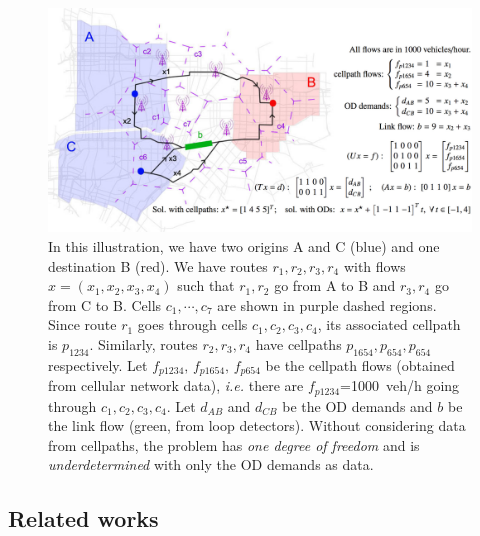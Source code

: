 \begin{figure}[h!]
  \centering
    \includegraphics[width=0.47	\textwidth]{figures/setup}
  \caption{\footnotesize{In this illustration, we have two origins A and C ({\color{blue}blue}) and one destination B ({\color{red}red}). We have routes $r_1,r_2,r_3,r_4$ with flows $x=(x_1,x_2,x_3, x_4)$ such that $r_1,r_2$ go from A to B and $r_3,r_4$ go from C to B. Cells $c_1,\cdots,c_7$ are shown in {\color{magenta} purple} dashed regions. Since route $r_1$ goes through cells $c_1,c_2,c_3,c_4$, its associated cellpath is $p_{1234}$. Similarly, routes $r_2,r_3,r_4$ have cellpaths $p_{1654},p_{654},p_{654}$ respectively. Let $f_{p1234},\,f_{p1654},\,f_{p654}$ be the cellpath flows (obtained from cellular network data), \emph{i.e.} there are $f_{p1234}$=1000~veh/h going through $c_1,c_2,c_3,c_4$. Let $d_{AB}$ and $d_{CB}$ be the OD demands and $b$ be the link flow ({\color{green}green}, from loop detectors). Without considering data from cellpaths, the problem has \emph{one degree of freedom} and is \emph{underdetermined} with only the OD demands as data.}}
  \label{fig:example-setup}
\end{figure}

\subsection{Related works}


